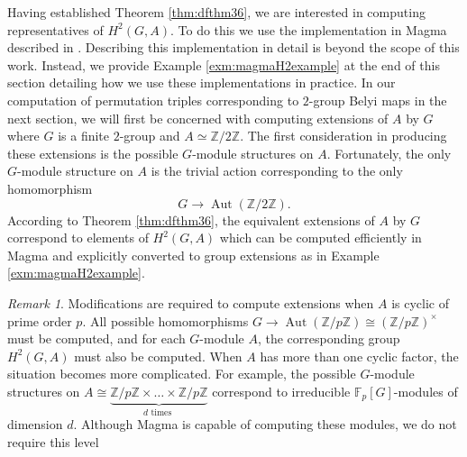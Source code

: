 \documentclass{dcthesis}
\newcommand{\ZZ}{\mathbb Z}
\newcommand{\mm}[1]{{\color{blue} \sf MM: [#1]}}
\newcommand{\FF}{\mathbb{F}}
\DeclareMathOperator{\Aut}{Aut}
\numberwithin{equation}{section}
\theoremstyle{definition}
\theoremstyle{remark}
\newtheorem{remark}[equation]{Remark}
\begin{document}
{{{    %
    Having established Theorem \ref{thm:dfthm36},
    we are interested in computing representatives
    of $H^2(G,A)$.
    To do this
    we use the implementation
    in \textsf{Magma} described in
    \cite[Cohomology and group extensions]{magmabook}.
    Describing this implementation in
    detail is beyond the scope of this work.
    Instead, we provide
    Example \ref{exm:magmaH2example}
    at the end of this section
    detailing how we use these
    implementations in practice.
    In our computation of permutation triples
    corresponding to $2$-group Belyi maps
    in the next section,
    we will first be concerned with computing
    extensions of $A$ by $G$
    where $G$ is a finite $2$-group
    and $A\simeq\ZZ/2\ZZ$.
    The first consideration in producing these
    extensions is the possible $G$-module
    structures on $A$.
    Fortunately,
    the only $G$-module structure on $A$
    is the trivial action
    corresponding to the only
    homomorphism
    \begin{equation}
      \label{eqn:trivialGmodule}
      G\to\Aut(\ZZ/2\ZZ).
    \end{equation}
    According to Theorem
    \ref{thm:dfthm36},
    the equivalent extensions of $A$ by $G$
    correspond to elements of $H^2(G,A)$
    which can be computed efficiently
    in \textsf{Magma}
    and explicitly converted to
    group extensions
    as in Example \ref{exm:magmaH2example}.
    \begin{remark}
      \label{rmk:abelianconsiderations}
      Modifications are
      required to compute
      extensions when
      $A$ is cyclic of prime order $p$.
      All possible homomorphisms
      $
        G\to\Aut(\ZZ/p\ZZ)\cong
        (\ZZ/p\ZZ)^\times
      $
      must be computed,
      and for each $G$-module $A$,
      the corresponding group
      $H^2(G,A)$ must also be computed.
      When $A$ has more than one cyclic factor,
      the situation becomes more complicated.
      For example,
      the possible $G$-module structures on
      $A\cong\underbrace{\ZZ/p\ZZ\times\dots\times\ZZ/p\ZZ}_{d\text{ times }}$
      correspond to
      irreducible $\FF_p[G]$-modules of dimension
      $d$.
      Although \textsf{Magma} is capable of
      computing these modules,
      we do not require this level

\end{remark}}}}
\end{document}
